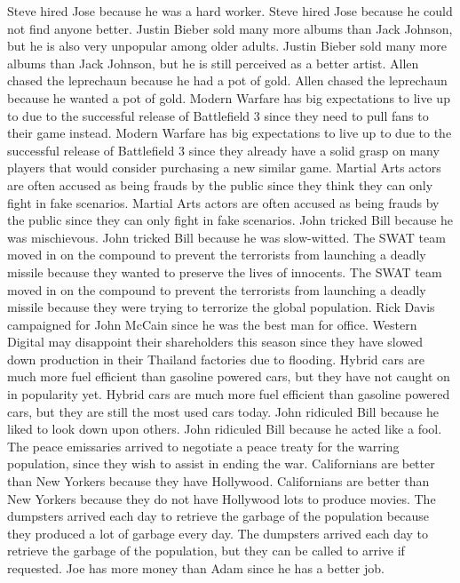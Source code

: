 \documentclass{article}
\begin{document}
\begin{enumerate}
	Steve hired Jose because he was a hard worker.
	Steve hired Jose because he could not find anyone better.
	Justin Bieber sold many more albums than Jack Johnson, but he is also very unpopular among older adults.
	Justin Bieber sold many more albums than Jack Johnson, but he is still perceived as a better artist.
	Allen chased the leprechaun because he had a pot of gold.
	Allen chased the leprechaun because he wanted a pot of gold.
	Modern Warfare has big expectations to live up to due to the successful release of Battlefield 3 since they need to pull fans to their game instead.
	Modern Warfare has big expectations to live up to due to the successful release of Battlefield 3 since they already have a solid grasp on many players that would consider purchasing a new similar game.
	Martial Arts actors are often accused as being frauds by the public since they think they can only fight in fake scenarios.
	Martial Arts actors are often accused as being frauds by the public since they can only fight in fake scenarios.
	John tricked Bill because he was mischievous.
	John tricked Bill because he was slow-witted.
	The SWAT team moved in on the compound to prevent the terrorists from launching a deadly missile because they wanted to preserve the lives of innocents.
	The SWAT team moved in on the compound to prevent the terrorists from launching a deadly missile because they were trying to terrorize the global population.
	Rick Davis campaigned for John McCain since he was the best man for office.
	Western Digital may disappoint their shareholders this season since they have slowed down production in their Thailand factories due to flooding.
	Hybrid cars are much more fuel efficient than gasoline powered cars, but they have not caught on in popularity yet.
	Hybrid cars are much more fuel efficient than gasoline powered cars, but they are still the most used cars today.
	John ridiculed Bill because he liked to look down upon others.
	John ridiculed Bill because he acted like a fool.
	The peace emissaries arrived to negotiate a peace treaty for the warring population, since they wish to assist in ending the war.
	Californians are better than New Yorkers because they have Hollywood.
	Californians are better than New Yorkers because they do not have Hollywood lots to produce movies.
	The dumpsters arrived each day to retrieve the garbage of the population because they produced a lot of garbage every day.
	The dumpsters arrived each day to retrieve the garbage of the population, but they can be called to arrive if requested.
	Joe has more money than Adam since he has a better job.

\end{enumerate}
\end{document}
